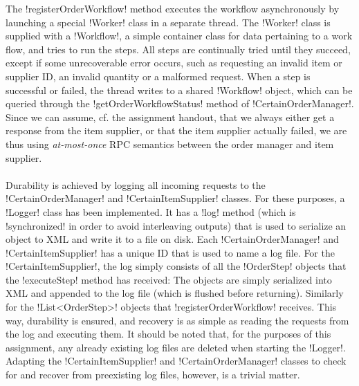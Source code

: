 \documentclass[a4paper, 12pt]{article}
\begin{document}
The !registerOrderWorkflow! method executes the workflow
asynchronously by launching a special !Worker! class in a separate
thread. The !Worker! class is supplied with a !Workflow!, a simple
container class for data pertaining to a work flow, and tries to run
the steps. All steps are continually tried until they succeed, except
if some unrecoverable error occurs, such as requesting an invalid item
or supplier ID, an invalid quantity or a malformed request. When a
step is successful or failed, the thread writes to a shared !Workflow!
object, which can be queried through the !getOrderWorkflowStatus!
method of !CertainOrderManager!. Since we can assume, cf. the
assignment handout, that we always either get a response from the item
supplier, or that the item supplier actually failed, we are thus using
\emph{at-most-once} RPC semantics between the order manager and item
supplier.

\paragraph{}

Durability is achieved by logging all incoming requests to the
!CertainOrderManager! and !CertainItemSupplier! classes. For these
purposes, a !Logger! class has been implemented. It has a !log! method
(which is !synchronized! in order to avoid interleaving outputs) that
is used to serialize an object to XML and write it to a file on
disk. Each !CertainOrderManager! and !CertainItemSupplier! has a
unique ID that is used to name a log file. For the
!CertainItemSupplier!, the log simply consists of all the !OrderStep!
objects that the !executeStep! method has received: The objects are
simply serialized into XML and appended to the log file (which is
flushed before returning). Similarly for the !List<OrderStep>! objects
that !registerOrderWorkflow! receives. This way, durability is
ensured, and recovery is as simple as reading the requests from the
log and executing them. It should be noted that, for the purposes of
this assignment, any already existing log files are deleted when
starting the !Logger!. Adapting the !CertainItemSupplier! and
!CertainOrderManager! classes to check for and recover from
preexisting log files, however, is a trivial matter.

\paragraph{}

\end{document}
